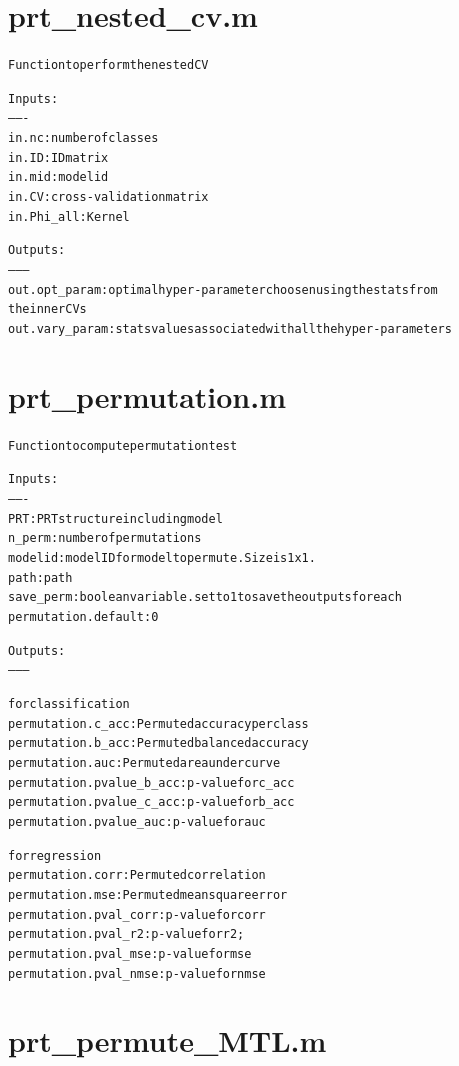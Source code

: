 \section{prt\_nested\_cv.m}
\begin{alltt}

 Function to perform the nested CV
 
 Inputs:
 -------
   in.nc:          number of classes
   in.ID:          ID matrix
   in.mid:         model id
   in.CV:          cross-validation matrix
   in.Phi\_all:     Kernel
 
 Outputs:
 --------
   out.opt\_param:  optimal hyper-parameter choosen using the stats from
                   the inner CVs
   out.vary\_param: stats values associated with all the hyper-parameters
\end{alltt}


\section{prt\_permutation.m}
\begin{alltt}

 Function to compute permutation test
 
 Inputs:
 -------
 PRT:          PRT structure including model
 n\_perm:       number of permutations
 modelid:      model ID for model to permute. Size is 1x1.
 path:         path
 save\_perm:    boolean variable. set to 1 to save the outputs for each
               permutation. default: 0
 
 Outputs:
 --------
 
 for classification
 permutation.c\_acc:        Permuted accuracy per class
 permutation.b\_acc:        Permuted balanced accuracy
 permutation.auc:          Permuted area under curve
 permutation.pvalue\_b\_acc: p-value for c\_acc
 permutation.pvalue\_c\_acc: p-value for b\_acc
 permutation.pvalue\_auc:   p-value for auc
 
 for regression
 permutation.corr:        Permuted correlation
 permutation.mse:         Permuted mean square error
 permutation.pval\_corr:   p-value for corr
 permutation.pval\_r2:     p-value for r2;
 permutation.pval\_mse:    p-value for mse
 permutation.pval\_nmse:   p-value for nmse
\end{alltt}


\section{prt\_permute\_MTL.m}
\begin{alltt}

\end{alltt}


